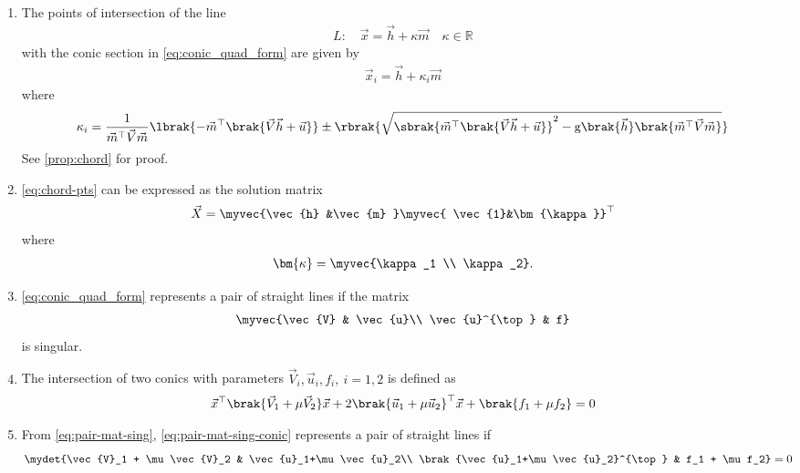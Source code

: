 \begin{enumerate}[label=\thesubsection.\arabic*,ref=\thesubsection.\theenumi]
		\item
  The points of intersection of the line 
\begin{align}
L: \quad \vec{x} = \vec{h} + \kappa \vec{m} \quad \kappa \in \mathbb{R}
\label{eq:conic_tangent}
\end{align}
with the conic section in \eqref{eq:conic_quad_form} are given by
\begin{align}
\vec{x}_i = \vec{h} + \kappa_i \vec{m}
	\label{eq:chord-pts}
\end{align}
%
where
\begin{multline}
\kappa_i = \frac{1}
{
\vec{m}^{\top}\vec{V}\vec{m}
}
\lbrak{-\vec{m}^{\top}\brak{\vec{V}\vec{h}+\vec{u}}}
\pm
\rbrak{\sqrt{
\sbrak{
\vec{m}^{\top}\brak{\vec{V}\vec{h}+\vec{u}}
}^2
	-\text{g}
\brak
{\vec{h}
}
\brak{\vec{m}^{\top}\vec{V}\vec{m}}
}
}
\label{eq:tangent_roots}
\end{multline}
See 
	 \ref{prop:chord}
	 for proof.
 \item 
	\eqref{eq:chord-pts}
	can be expressed as the solution matrix
\begin{align}
	\vec{X} = \myvec{\vec{h} &\vec{m} }\myvec{ \vec{1}&\bm{\kappa}}^\top
\end{align}
where 
\begin{align}
	\bm{\kappa} = \myvec{\kappa_1 \\ \kappa_2}.
\end{align}


  \item
\eqref{eq:conic_quad_form} represents a pair of straight lines if 
the matrix 
  \begin{align} 
	  \myvec{\vec{V} & \vec{u}\\ \vec{u}^{\top} & f}  
	  \label{eq:pair-mat-sing}
  \end{align} 
  is singular.
\item The intersection of two conics 
with parameters $\vec{V}_i, \vec{u}_i, f_i,\ i = 1,2$
	is defined
as
\begin{align}
	\vec{x}^{\top}\brak{\vec{V}_1 + \mu\vec{V}_2}\vec{x}+2 \brak{\vec{u}_1+\mu \vec{u}_2}^{\top} \vec{x} 
	+ \brak{f_1+\mu f_2}= 0
	  \label{eq:pair-mat-sing-conic}
    \end{align}
	  
	  
\item From \eqref{eq:pair-mat-sing}, \eqref{eq:pair-mat-sing-conic} represents a pair of straight lines if
\begin{align}
	  \label{eq:pair-mat-sing-conic-det}
\mydet{\vec{V}_1 + \mu\vec{V}_2 & \vec{u}_1+\mu \vec{u}_2\\ \brak{\vec{u}_1+\mu \vec{u}_2}^{\top} & f_1 + \mu f_2} &= 0
\end{align}
\end{enumerate}
